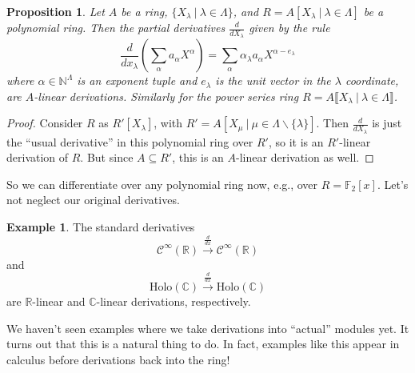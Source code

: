 \documentclass{amsart}[12pt]
\def\cC{\mathcal C}
\newcommand{\R}{{\mathbb{R}}}
\newcommand{\F}{\mathbb{F}}
\newcommand{\C}{\mathbb{C}}
\newcommand{\N}{\mathbb{N}}
\numberwithin{equation}{section}
\theoremstyle{plain} %
\newtheorem{prop}[equation]{Proposition}
\theoremstyle{definition}
\newtheorem{ex}[equation]{Example}
\theoremstyle{remark}
\newcommand{\xra}[1]{\xrightarrow{#1}}
\newcommand{\Holo}{\mathrm{Holo}}
\begin{document}
\begin{prop}
Let $A$ be a ring, $\{X_\lambda \  | \ \lambda\in \Lambda\}$, and $R=A[X_\lambda \  | \ \lambda\in \Lambda]$ be a polynomial ring. Then the partial derivatives $\frac{d}{d X_\lambda}$ given by the rule
\[ \frac{d}{dx_\lambda} ( \sum_{\alpha} a_\alpha X^{\alpha}) = \sum_{\alpha} \alpha_\lambda a_\alpha X^{\alpha-e_\lambda}\]where $\alpha\in \N^{\Lambda}$ is an exponent tuple and $e_\lambda$ is the unit vector in the $\lambda$ coordinate,
are $A$-linear derivations. Similarly for the power series ring $R=A\llbracket X_\lambda \  | \ \lambda\in \Lambda\rrbracket$.
\end{prop}
\begin{proof}
Consider $R$ as $R'[X_\lambda]$, with $R'=A[X_\mu \ | \ \mu\in \Lambda\smallsetminus \{\lambda\}]$. Then $\frac{d}{d X_\lambda}$ is just the ``usual derivative'' in this polynomial ring over $R'$, so it is an $R'$-linear derivation of $R$. But since $A\subseteq R'$, this is an $A$-linear derivation as well.
\end{proof}



So we can differentiate over any polynomial ring now, e.g., over $R=\F_2[x]$. Let's not neglect our original derivatives.

\begin{ex}
The standard derivatives
\[  \cC^{\infty}(\R) \xra{\frac{d}{dx}} \cC^{\infty}(\R)\]
and 
\[ \Holo(\C) \xra{\frac{d}{dx}}\Holo(\C) \]
are $\R$-linear and $\C$-linear derivations, respectively.
\end{ex}

We haven't seen examples where we take derivations into ``actual'' modules yet. It turns out that this is a natural thing to do. In fact, examples like this appear in calculus before derivations back into the ring!
\end{document}
